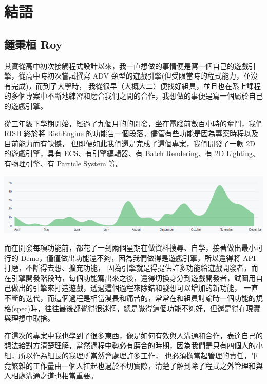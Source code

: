 \chapter{結語}

\section{鍾秉桓 Roy}
\label{sec:Roy}

其實從高中初次接觸程式設計以來，我一直想做的事情便是寫一個自己的遊戲引擎，從高中時初次嘗試撰寫 ADV 類型的遊戲引擎(但受限當時的程式能力，並沒有完成)，而到了大學時，
我從很早（大概大二）便找好組員，並且也在系上課程的多個專案中不斷地練習和磨合我們之間的合作，我想做的事便是寫一個屬於自己的遊戲引擎。

從三年級下學期開始，經過了九個月的的開發，坐在電腦前數百小時的奮鬥，我們 RISH 終於將 RishEngine 的功能告一個段落，儘管有些功能是因為專案時程以及目前能力而有缺憾，
但即便如此我們還是完成了這個專案，我們開發了一款 2D 的遊戲引擎，具有 ECS、有引擎編輯器、有 Batch Rendering、有 2D Lighting、有物理引擎、有 Particle System 等。

    \begin{center}
    \includegraphics[width=\textwidth]{./resources/ch6/commit.png}
    \end{center}

而在開發每項功能前，都花了一到兩個星期在做資料搜尋、自學，接著做出最小可行的 Demo，僅僅做出功能還不夠，因為我們做得是遊戲引擎，所以還得將 API 打磨，不斷得去想、擴充功能，
因為引擎就是得提供許多功能給遊戲開發者，而在引擎開發階段時，每個功能寫出來之後，還得切換身分到遊戲開發者，試圖用自己做出的引擎來打造遊戲，透過這個過程來除錯和發想可以增加的新功能，
一直不斷的迭代，而這個過程是相當漫長和痛苦的，常常在和組員討論時一個功能的規格(spec)時，往往最後都覺得很迷惘，總是覺得這個功能不夠好，但還是得在現實與理想中取捨。

在這次的專案中我也學到了很多東西，像是如何有效與人溝通和合作，表達自己的想法給對方清楚理解，當然過程中勢必有磨合的時期，因為我們是只有四個人的小組，所以作為組長的我理所當然會處理許多工作，
也必須擔當起管理的責任，畢竟繁雜的工作量由一個人扛起也過於不切實際，清楚了解到除了程式之外管理和與人相處溝通之道也相當重要。

